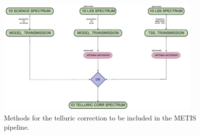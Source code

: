 \begin{figure}[ht]
  \centering
  \includegraphics[width=0.9\textwidth]{figures/tell_corr_methods.pdf}
  \caption{Methods for the telluric correction to be included in the \ac{METIS} pipeline.}
  \label{Fig:tellcorrmethods}
\end{figure}
